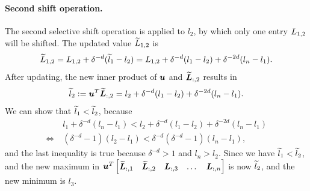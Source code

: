 \paragraph{Second shift operation.}
The second selective shift operation is applied to $l_2$, by which only one entry ${L}_{1,2}$ will be shifted. The updated value $\widetilde{{L}}_{1,2}$ is
\begin{equation*}
    \widetilde{{L}}_{1,2}
    = {L}_{1,2} + \delta^{-d} (\widetilde{l}_1 - l_2)
    = {L}_{1,2} + \delta^{-d} (l_1 - l_2) + \delta^{-2d} (l_n - l_1).
\end{equation*}
After updating, the new inner product of ${\bm{u}}$ and $\widetilde{{\bm{L}}}_{:,2}$ results in
\begin{equation*}
    \wt l_2 \defeq \vu^T \wt \mL_{:,2} = l_2 + \delta^{-d} (l_1 - l_2) + \delta^{-2d} (l_n - l_1).%
\end{equation*}
We can show that $\widetilde{l}_1 < \widetilde{l}_2$, because
\begin{align*}
    &l_1 + \delta^{-d} (l_n - l_1) < l_2 + \delta^{-d} (l_1 - l_2) + \delta^{-2d} (l_n - l_1)\\
    \iff~&
    (\delta^{-d}-1) (l_2 - l_1) < \delta^{-d}(\delta^{-d}-1) (l_n - l_1),
\end{align*}
and the last inequality is true because $\delta^{-d} > 1$ and $l_n > l_2$.
Since we have $\widetilde{l}_1 < \widetilde{l}_2$, and the new maximum in ${\bm{u}}^T \begin{bmatrix} \widetilde{{\bm{L}}}_{:,1} & \widetilde{{\bm{L}}}_{:,2} & {\bm{L}}_{:,3} & \dots & {\bm{L}}_{:,n} \end{bmatrix}$ is now $\widetilde{l}_2$, and the new minimum is $l_3$.

